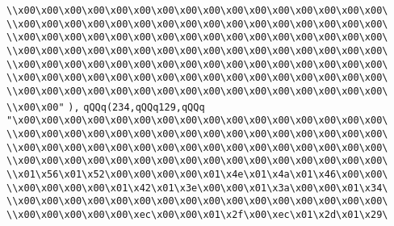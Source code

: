 \verb|\\x00\x00\x00\x00\x00\x00\x00\x00\x00\x00\x00\x00\x00\x00\x00\x00\|\newline
\verb|\\x00\x00\x00\x00\x00\x00\x00\x00\x00\x00\x00\x00\x00\x00\x00\x00\|\newline
\verb|\\x00\x00\x00\x00\x00\x00\x00\x00\x00\x00\x00\x00\x00\x00\x00\x00\|\newline
\verb|\\x00\x00\x00\x00\x00\x00\x00\x00\x00\x00\x00\x00\x00\x00\x00\x00\|\newline
\verb|\\x00\x00\x00\x00\x00\x00\x00\x00\x00\x00\x00\x00\x00\x00\x00\x00\|\newline
\verb|\\x00\x00\x00\x00\x00\x00\x00\x00\x00\x00\x00\x00\x00\x00\x00\x00\|\newline
\verb|\\x00\x00\x00\x00\x00\x00\x00\x00\x00\x00\x00\x00\x00\x00\x00\x00\|\newline
\verb|\\x00\x00"|\newline
\verb|),|\newline
\verb|qQQq(234,qQQq129,qQQq|\newline
\verb|"\x00\x00\x00\x00\x00\x00\x00\x00\x00\x00\x00\x00\x00\x00\x00\x00\|\newline
\verb|\\x00\x00\x00\x00\x00\x00\x00\x00\x00\x00\x00\x00\x00\x00\x00\x00\|\newline
\verb|\\x00\x00\x00\x00\x00\x00\x00\x00\x00\x00\x00\x00\x00\x00\x00\x00\|\newline
\verb|\\x00\x00\x00\x00\x00\x00\x00\x00\x00\x00\x00\x00\x00\x00\x00\x00\|\newline
\verb|\\x01\x56\x01\x52\x00\x00\x00\x00\x01\x4e\x01\x4a\x01\x46\x00\x00\|\newline
\verb|\\x00\x00\x00\x00\x01\x42\x01\x3e\x00\x00\x01\x3a\x00\x00\x01\x34\|\newline
\verb|\\x00\x00\x00\x00\x00\x00\x00\x00\x00\x00\x00\x00\x00\x00\x00\x00\|\newline
\verb|\\x00\x00\x00\x00\x00\xec\x00\x00\x01\x2f\x00\xec\x01\x2d\x01\x29\|\newline
